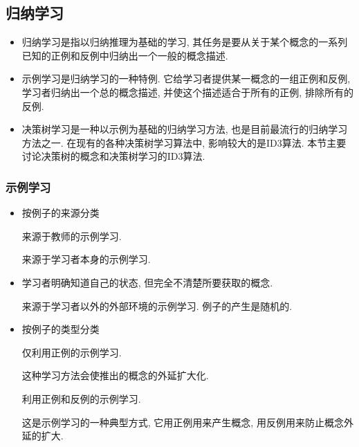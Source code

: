 \subsection{归纳学习}
\begin{itemize}
    \item 归纳学习是指以归纳推理为基础的学习, 其任务是要从关于某个概念的一系列已知的正例和反例中归纳出一个一般的概念描述.
    \item 示例学习是归纳学习的一种特例. 它给学习者提供某一概念的一组正例和反例, 学习者归纳出一个总的概念描述, 并使这个描述适合于所有的正例, 排除所有的反例.
    \item 决策树学习是一种以示例为基础的归纳学习方法, 也是目前最流行的归纳学习方法之一.
    在现有的各种决策树学习算法中, 影响较大的是ID3算法. 本节主要讨论决策树的概念和决策树学习的ID3算法.
\end{itemize}
\subsubsection{示例学习}
\begin{itemize}
\item 按例子的来源分类

  \qquad  {} 来源于教师的示例学习.

  \qquad  {} 来源于学习者本身的示例学习.
\item 学习者明确知道自己的状态, 但完全不清楚所要获取的概念.

    \qquad  {} 来源于学习者以外的外部环境的示例学习. 例子的产生是随机的.
\item 按例子的类型分类

    \qquad  {} 仅利用正例的示例学习.

    \qquad  \qquad 这种学习方法会使推出的概念的外延扩大化.

    \qquad  {} 利用正例和反例的示例学习.

    \qquad  这是示例学习的一种典型方式, 它用正例用来产生概念, 用反例用来防止概念外延的扩大.
\end{itemize}
